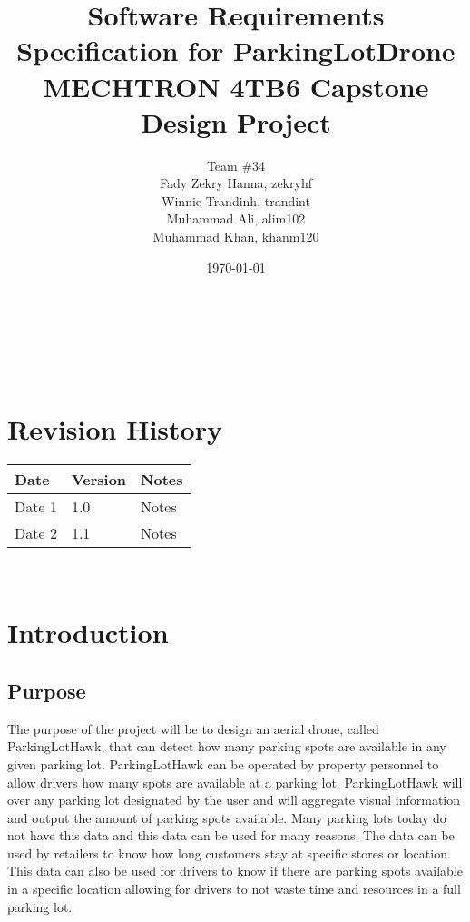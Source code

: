\documentclass{article}
\begin{document}
\title{
Software Requirements Specification for ParkingLotDrone \\
  \large MECHTRON 4TB6 Capstone Design Project 
    }

\author{\authname Team \#34 \\
Fady Zekry Hanna, zekryhf \\
Winnie Trandinh, trandint \\
Muhammad Ali, alim102 \\
Muhammad Khan, khanm120}

\date{\today}
	
\maketitle

~\newpage


\tableofcontents

~\newpage

\section*{Revision History}

\begin{tabularx}{\textwidth}{p{3cm}p{2cm}X}
\toprule {\bf Date} & {\bf Version} & {\bf Notes}\\
\midrule
Date 1 & 1.0 & Notes\\
Date 2 & 1.1 & Notes\\
\bottomrule
\end{tabularx}

~\newpage


\section{Introduction}
\label{sec:Intro}
\subsection{Purpose}
The purpose of the project will be to design an aerial drone, called ParkingLotHawk, that can detect how many parking spots are available in any given parking lot. ParkingLotHawk can be operated by property personnel to allow drivers how many spots are available at a parking lot. ParkingLotHawk will over any parking lot designated by the user and will aggregate visual information and output the amount of parking spots available. Many parking lots today do not have this data and this data can be used for many reasons.  The data can be used by retailers to know how long customers stay at specific stores or location. This data can also be used for drivers to know if there are parking spots available in a specific location allowing for drivers to not waste time and resources in a full parking lot. 
\end{document}
